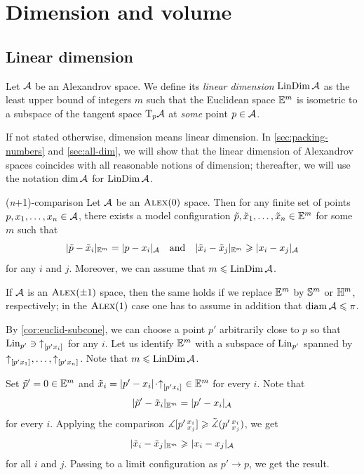 \chapter{Dimension and volume}\label{chap:dim}

\section{Linear dimension}

Let $\mathcal{A}$ be an Alexandrov space.
We define its \emph{linear dimension} $\mathop{\rm LinDim}\nolimits \mathcal{A}$ as the least upper bound of integers $m$ such that
the Euclidean space $\mathbb{E}^m$ is isometric to a subspace of the tangent space $\mathrm{T}_p\mathcal{A}$ at \textit{some} point $p\in \mathcal{A}$.

If not stated otherwise, dimension means linear dimension.
In \ref{sec:packing-numbers} and \ref{sec:all-dim}, we will show that the linear dimension of Alexandrov spaces coincides with all reasonable notions of dimension;
thereafter, we will use the notation $\operatorname{\rm dim}\nolimits\mathcal{A}$ for $\mathop{\rm LinDim}\nolimits\mathcal{A}$.

\begin{thm}{(\textit{n}+1)-comparison}\label{thm:n+1}
Let $\mathcal{A}$ be an $\textup{\textsc{Alex}}(0)$ space.
Then for any finite set of points $p,x_1,\dots,x_n\in \mathcal{A}$, there exists a model configuration
$\tilde p,\tilde x_1,\dots,\tilde x_n\in \mathbb{E}^m$ for some $m$ such that
\[|\tilde p-\tilde x_i|_{\mathbb{E}^m}=| p- x_i|_{\mathcal{A}}
\quad\text{and}\quad
|\tilde x_i-\tilde x_j|_{\mathbb{E}^m}\geqslant |x_i- x_j|_{\mathcal{A}}\]
for any $i$ and $j$.
Moreover, we can assume that $m\leqslant \mathop{\rm LinDim}\nolimits\mathcal{A}$.

If $\mathcal{A}$ is an $\textup{\textsc{Alex}}(\pm1)$ space, then the same holds if we replace $\mathbb{E}^m$ by $\mathbb{S}^m$ or $\mathbb{H}^m$, respectively; in the $\textup{\textsc{Alex}}(1)$ case one has to assume in addition that $\operatorname{\rm diam}\nolimits \mathcal{A}\leqslant \pi$.
\end{thm}

By \ref{cor:euclid-subcone}, we can choose a point $p'$ arbitrarily close to $p$ so that
$\mathop{\rm Lin}\nolimits_{p'}\ni {\uparrow}_{[{p'}{x_i}]_{{}}}$ for any $i$.
Let us identify $\mathbb{E}^m$ with a subspace of $\mathop{\rm Lin}\nolimits_{p'}$ spanned by ${\uparrow}_{[{p'}{x_1}]_{{}}},\dots,{\uparrow}_{[{p'}{x_n}]_{{}}}$.
Note that $m\leqslant \mathop{\rm LinDim}\nolimits\mathcal{A}$.

Set $\tilde p'=0\in \mathbb{E}^m$ and $\tilde x_i=\dist{p'}{x_i}{}\cdot\dir{p'}{x_i}\in \EE^m$ for every $i$.
Note that
\[|\tilde p'-\tilde x_i|_{\mathbb{E}^m}=| p'- x_i|_{\mathcal{A}}\]
for every $i$.
Applying the comparison $\measuredangle[p'\,{}^{x_i}_{x_j}]\geqslant \tilde\measuredangle(p'\,{}^{x_i}_{x_j})$, we get
\[|\tilde x_i-\tilde x_j|_{\mathbb{E}^m}\geqslant |x_i- x_j|_{\mathcal{A}}\]
for all $i$ and $j$.
Passing to a limit configuration as $p'\to p$, we get the result.

